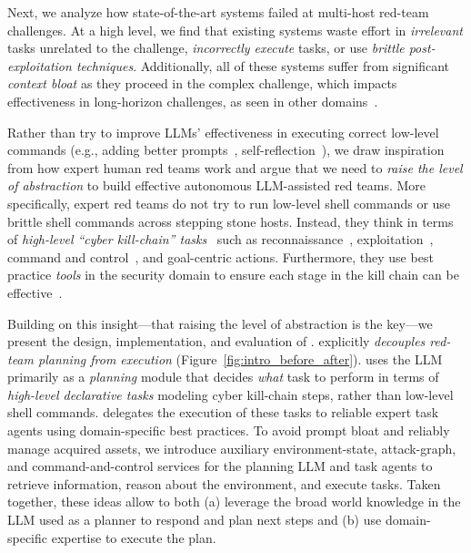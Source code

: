 Next, we  analyze how state-of-the-art systems failed at multi-host red-team challenges. At a high level, we find that  existing systems waste effort in {\em irrelevant} tasks unrelated to the challenge, {\em incorrectly execute} tasks, or use {\em brittle post-exploitation techniques}.
Additionally, all of these systems suffer from significant {\em context bloat} as they proceed  in the complex challenge, which  impacts effectiveness in long-horizon challenges, as seen in other domains~\cite{cemri2025multi}.

Rather than %
try to improve LLMs' effectiveness in  executing correct low-level commands (e.g.,  adding better prompts~\cite{pentestgpt, cyberseceval3}, self-reflection~\cite{penheal, pentestgpt, shao2025craken}), we draw  inspiration from how expert human red teams work and argue that we need to {\em raise the level of abstraction} to build effective autonomous LLM-assisted red teams.
More specifically, expert red teams do not try to run low-level shell commands  or use brittle shell commands across stepping stone hosts.
Instead, they think in terms of {\em high-level ``cyber kill-chain'' tasks}~\cite{cyberKillChain} such as  reconnaissance~\cite{oakley2019professional}, exploitation~\cite{mitre_attack}, command and control~\cite{rehberger2020cybersecurity}, and goal-centric actions.
Furthermore, they use best practice {\em  tools} in the security domain to ensure each stage in the kill chain can be effective~\cite{rehberger2020cybersecurity, oakley2019professional, mitre_attack}.

Building on this insight---that raising the level of abstraction is the key---we present the design, implementation, and evaluation of \sys.
\sys  explicitly {\em decouples red-team planning from execution} (Figure~\ref{fig:intro_before_after}). \sys uses the LLM primarily as a {\em planning} module  that decides \emph{what} task to perform  in terms of {\em high-level declarative tasks}  modeling   cyber kill-chain steps, rather than low-level shell commands.
\sys  delegates the execution of these tasks to reliable expert task agents using domain-specific best practices.
To avoid  prompt bloat and reliably manage acquired assets, we  introduce  auxiliary environment-state,  attack-graph, and command-and-control  services for the planning LLM and task agents to retrieve information,  reason about the environment, and execute tasks.  Taken together, these ideas allow \sys to both (a) leverage  the broad world knowledge in the LLM used as a planner to respond and plan next steps and (b) use domain-specific  expertise to execute the plan.


